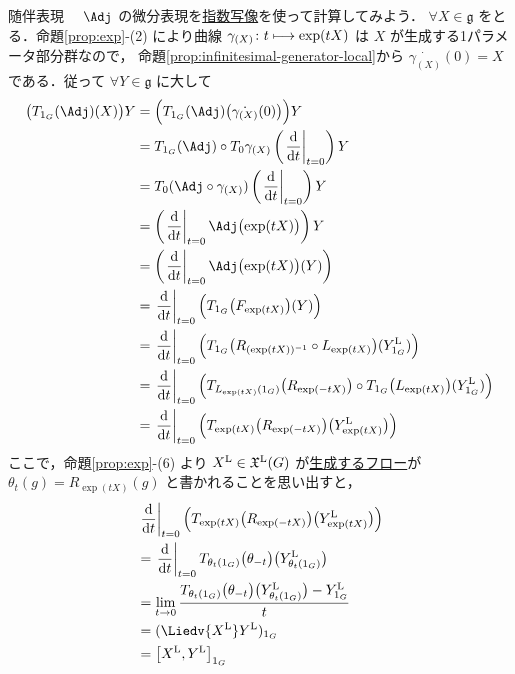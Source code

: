 \documentclass[geometry_main]{subfiles}
\begin{document}
\begin{myexample}[label=def:Lie-adj]{随伴表現}
    　$\Adj$ の微分表現を\hyperref[def:exp]{指数写像}を使って計算してみよう．
    $\forall X \in \mathfrak{g}$ をとる．命題\ref{prop:exp}-(2) により曲線 $\gamma_{(X)} \colon t \longmapsto \exp(tX)$ は $X$ が生成する1パラメータ部分群なので，
    命題\ref{prop:infinitesimal-generator-local}から $\dot{\gamma_{(X)}}(0) = X$ である．従って $\forall Y \in \mathfrak{g}$ に大して
    \begin{align}
        \bigl(T_{1_G}(\Adj) (X)\bigr)Y 
        &= \Bigl( T_{1_G} (\Adj)\bigl(\dot{\gamma_{(X)}}(0)\bigr) \Bigr) Y \\
        &= T_{1_G} (\Adj) \circ T_0 \gamma_{(X)} \left( \eval{\dv{}{t}}_{t=0} \right)  Y \\
        &= T_{0} (\Adj \circ \gamma_{(X)}) \left( \eval{\dv{}{t}}_{t=0}  \right) Y \\
        &= \left(\eval{\dv{}{t}}_{t=0} \Adj \bigl(\exp (tX)\bigr) \right) Y \\
        &= \left(\eval{\dv{}{t}}_{t=0} \Adj \bigl(\exp (tX)\bigr)(Y) \right) \\
        &= \eval{\dv{}{t}}_{t=0} \Bigl(T_{1_G}\bigl( F_{\exp (tX)}  \bigr)(Y) \Bigr) \\
        &= \eval{\dv{}{t}}_{t=0} \Bigl(T_{1_G}\bigl( R_{(\exp (tX))^{-1}} \circ L_{\exp (tX)} \bigr)(\Lie{Y}_{1_G}) \Bigr)\\
        &= \eval{\dv{}{t}}_{t=0} \Bigl(T_{L_{\exp (tX)}(1_G)}\bigl( R_{\exp (-tX)} \bigr) \circ T_{1_G} \bigl( L_{\exp (tX)} \bigr)(\Lie{Y}_{1_G}) \Bigr)\\
        &= \eval{\dv{}{t}}_{t=0} \Bigl(T_{\exp (tX)}\bigl( R_{\exp (-tX)} \bigr) \bigl(\Lie{Y}_{\exp (tX)}\bigr) \Bigr)
    \end{align}
    ここで，命題\ref{prop:exp}-(6) より $X^{\mathrm{L}} \in \mathfrak{X}^{\mathrm{L}}(G)$ が\hyperref[thm:fundamental-flow]{生成するフロー}が $\theta_t (g) = R_{\exp(tX)} (g)$ と書かれることを思い出すと，
    \begin{align}
        &\eval{\dv{}{t}}_{t=0} \Bigl(T_{\exp (tX)}\bigl( R_{\exp (-tX)} \bigr) \bigl(\Lie{Y}_{\exp (tX)}\bigr) \Bigr) \\
        &= \eval{\dv{}{t}}_{t=0} T_{\theta_t(1_G)} \bigl(\theta_{-t}\bigr) \bigl( \Lie{Y}_{\theta_t (1_G)} \bigr) \\
        &= \lim_{t \to 0} \frac{T_{\theta_t(1_G)} \bigl(\theta_{-t}\bigr) \bigl( \Lie{Y}_{\theta_t (1_G)} \bigr) - \Lie{Y}_{1_G}}{t} \\
        &= (\Liedv{\Lie{X}} \Lie{Y})_{1_G} \\
        &= \comm{\Lie{X}}{\Lie{Y}}_{1_G} \\

\end{align}
\end{myexample}
\end{document}
